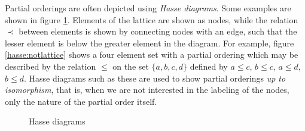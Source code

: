 Partial orderings are often depicted using \emph{Hasse diagrams}. Some examples are shown in figure \ref{hasse}. Elements of the lattice are shown as nodes, while the relation $\prec$ between elements is shown by connecting nodes with an edge, such that the lesser element is below the greater element in the diagram. For example, figure \ref{hasse:notlattice} shows a four element set with a partial ordering which may be described by the relation $\le$ on the set $\{a,b,c,d\}$ defined by $a \le c$, $b \le c$, $a \le d$, $b\le d$. Hasse diagrams such as these are used to show partial orderings \emph{up to isomorphism}, that is, when we are not interested in the labeling of the nodes, only the nature of the partial order itself. 
\begin{figure}
\begin{center}

%
\hfill
{}
\hfill
{}
\hfill
\caption{Hasse diagrams}
\label{hasse}
\end{center}
\end{figure}

